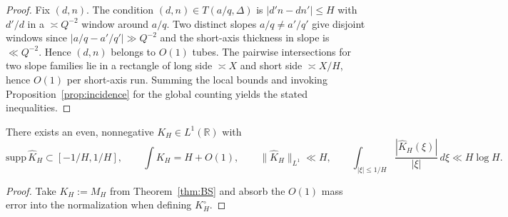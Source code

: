 \begin{proof}
Fix $(d,n)$. The condition $(d,n)\in T(a/q,\Delta)$ is $|d'n-dn'|\le H$ with $d'/d$ in a $\asymp Q^{-2}$ window around $a/q$. Two distinct slopes $a/q\ne a'/q'$ give disjoint windows since $|a/q-a'/q'|\gg Q^{-2}$ and the short-axis thickness in slope is $\ll Q^{-2}$. Hence $(d,n)$ belongs to $O(1)$ tubes. The pairwise intersections for two slope families lie in a rectangle of long side $\asymp X$ and short side $\asymp X/H$, hence $O(1)$ per short-axis run. Summing the local bounds and invoking Proposition~\ref{prop:incidence} for the global counting yields the stated inequalities.
\end{proof}

\begin{corollary}\label{cor:KH}
There exists an even, nonnegative $K_H\in L^1(\mathbb R)$ with
\[
\mathrm{supp}\,\widehat K_H\subset[-1/H,1/H],\qquad
\int K_H=H+O(1),\qquad \|\widehat K_H\|_{L^1}\ll H,\qquad
\int_{|\xi|\le 1/H}\frac{|\widehat K_H(\xi)|}{|\xi|}\,d\xi\ll H\log H.
\]
\end{corollary}

\begin{proof}
Take $K_H:=M_H$ from Theorem~\ref{thm:BS} and absorb the $O(1)$ mass error into the normalization when defining $K_H^\circ$.
\end{proof}
